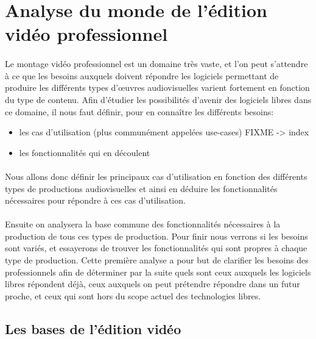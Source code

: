 \newpage

\section {Analyse du monde de l'édition vidéo professionnel}

\paragraph{}
Le montage vidéo professionnel est un domaine très vaste, et l'on peut
s'attendre à ce que les besoins auxquels doivent répondre les logiciels
permettant de produire les différents types d'œuvres audiovisuelles
varient fortement en fonction du type de contenu. Afin d'étudier
les possibilités d'avenir des logiciels libres dans ce domaine, il nous faut
définir, pour en connaître les différents besoins:
\begin {itemize}
  \item {les cas d'utilisation (plus communément appelées use-cases) FIXME -> index}
  \item {les fonctionnalités qui en découlent}
\end{itemize}


\paragraph{}
Nous allons donc définir les principaux cas d'utilisation en fonction des
différents types de productions audiovisuelles et ainsi en déduire les fonctionnalités
nécessaires pour répondre à ces cas d'utilisation.

\paragraph{}
Ensuite on analysera la base commune des fonctionnalités nécessaires à la
production de tous ces types de production.  Pour finir
nous verrons si les besoins sont variés, et essayerons de trouver les
fonctionnalités qui sont propres à chaque type de production. Cette première
analyse a pour but de clarifier les besoins des professionnels afin de
déterminer par la suite quels sont ceux auxquels les logiciels libres répondent déjà,
ceux auxquels on peut prétendre répondre dans un futur proche, et ceux qui
sont hors du scope actuel des technologies libres.

\subsection{Les bases de l'édition vidéo}

